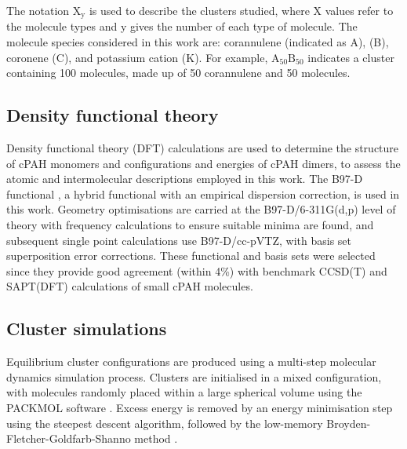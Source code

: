 The notation $\text{X}_{\text{y}}$ is used to describe the clusters studied, where X values refer to the molecule types and y gives the number of each type of molecule. The molecule species considered in this work are: corannulene (indicated as A),  (B), coronene (C), and potassium cation (K). For example, $\text{A}_{\text{50}}\text{B}_{\text{50}}$ indicates a cluster containing 100 molecules, made up of 50 corannulene and 50  molecules.


\subsection{Density functional theory}
Density functional theory (DFT) calculations are used to determine the structure of cPAH monomers and configurations and energies of cPAH dimers, to assess the atomic and intermolecular descriptions employed in this work. The B97-D functional \cite{grimme2006semiempirical}, a hybrid functional with an empirical dispersion correction, is used in this work. Geometry optimisations are carried at the B97-D/6-311G(d,p) level of theory with frequency calculations to ensure suitable minima are found, and subsequent single point calculations use B97-D/cc-pVTZ, with basis set superposition error corrections.  These functional and basis sets were selected since they provide good agreement (within 4\%) with benchmark CCSD(T) \cite{janowski2011convex} and SAPT(DFT) \cite{Cabaleiro-Lago2018} calculations of small cPAH molecules. %

\subsection{Cluster simulations}
Equilibrium cluster configurations are produced using a multi-step molecular dynamics simulation process. Clusters are initialised in a mixed configuration, with molecules randomly placed within a large spherical volume using the PACKMOL software \cite{Martinez2009PACKMOL}. Excess energy is removed by an energy minimisation step using the steepest descent algorithm, followed by the low-memory Broyden-Fletcher-Goldfarb-Shanno method \cite{L-BFGS}.

